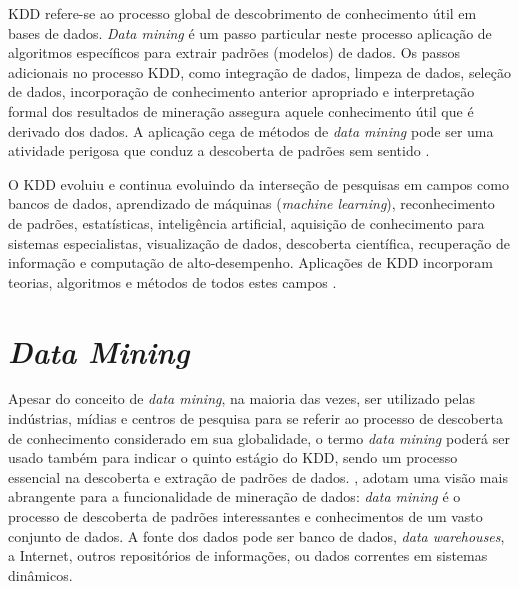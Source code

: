 KDD refere-se ao processo global de descobrimento de conhecimento útil em bases de dados. \textit{Data mining} é um passo particular neste processo aplicação de algoritmos específicos para extrair padrões (modelos) de dados. Os passos adicionais no processo KDD, como integração de dados, limpeza de dados, seleção de dados, incorporação de conhecimento anterior apropriado e interpretação formal dos resultados de mineração assegura aquele conhecimento útil que é derivado dos dados. A aplicação cega de métodos de \textit{data mining} pode ser uma atividade perigosa que conduz a descoberta de padrões sem sentido \cite{navega}. 

O KDD evoluiu e continua evoluindo da interseção de pesquisas em campos como bancos de dados, aprendizado de máquinas (\textit{machine learning}), reconhecimento de padrões, estatísticas, inteligência artificial, aquisição de conhecimento para sistemas especialistas, visualização de dados, descoberta científica, recuperação de informação e computação de alto-desempenho. Aplicações de KDD incorporam teorias, algoritmos e métodos de todos estes campos \cite{lemos}. 



\section{\textit{Data Mining}}\label{sec:data-mining}
Apesar do conceito de \textit{data mining}, na maioria das vezes, ser utilizado pelas indústrias, mídias e centros de pesquisa para se referir ao processo de descoberta de conhecimento considerado em sua globalidade, o termo \textit{data mining} poderá ser usado também para indicar o quinto estágio do KDD, sendo um processo essencial na descoberta e extração de padrões de dados. , adotam uma visão mais abrangente para a funcionalidade de mineração de dados: \textit{data mining} é o processo de descoberta de padrões interessantes e conhecimentos de um vasto conjunto de dados. A fonte dos dados pode ser banco de dados, \textit{data warehouses}, a Internet, outros repositórios de informações, ou dados correntes em sistemas dinâmicos.

